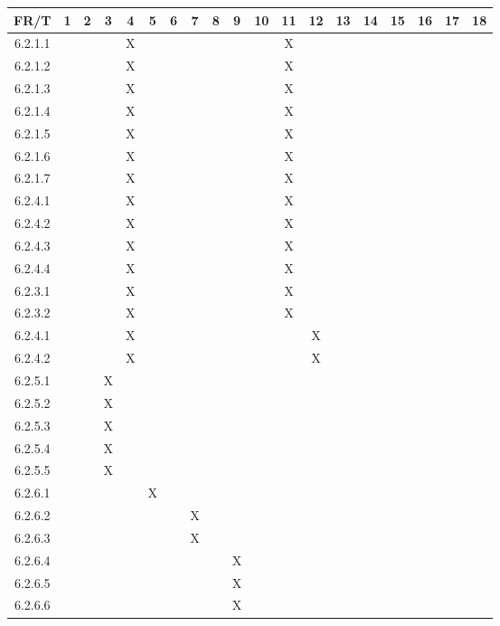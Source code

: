 \documentclass[12pt, titlepage]{article}
\begin{document}
\begin{tabular}{|c|c|c|c|c|c|c|c|c|c|c|c|c|c|c|c|c|c|c|}
    \hline
     FR/T &1 &2 &3 &4 &5 &6 &7 &8 &9 &10 &11 &12 &13 &14 &15 &16 &17 &18 \\
    \hline
     6.2.1.1 & & & &X & & & & & & &X & & & & & & & \\
     6.2.1.2 & & & &X & & & & & & &X & & & & & & & \\
     6.2.1.3 & & & &X & & & & & & &X & & & & & & & \\
     6.2.1.4 & & & &X & & & & & & &X & & & & & & & \\
     6.2.1.5 & & & &X & & & & & & &X & & & & & & & \\
     6.2.1.6 & & & &X & & & & & & &X & & & & & & & \\
     6.2.1.7 & & & &X & & & & & & &X & & & & & & & \\
     6.2.4.1 & & & &X & & & & & & &X & & & & & & & \\
     6.2.4.2 & & & &X & & & & & & &X & & & & & & & \\
     6.2.4.3 & & & &X & & & & & & &X & & & & & & & \\
     6.2.4.4 & & & &X & & & & & & &X & & & & & & & \\
     6.2.3.1 & & & &X & & & & & & &X & & & & & & & \\
     6.2.3.2 & & & &X & & & & & & &X & & & & & & & \\
     6.2.4.1 & & & &X & & & & & & & &X & & & & & & \\
     6.2.4.2 & & & &X & & & & & & & &X & & & & & & \\
     6.2.5.1 & & &X & & & & & & & & & & & & & & & \\
     6.2.5.2 & & &X & & & & & & & & & & & & & & & \\
     6.2.5.3 & & &X & & & & & & & & & & & & & & & \\
     6.2.5.4 & & &X & & & & & & & & & & & & & & & \\
     6.2.5.5 & & &X & & & & & & & & & & & & & & & \\
     6.2.6.1 & & & & &X & & & & & & & & & & & & & \\
     6.2.6.2 & & & & & & &X & & & & & & & & & & & \\
     6.2.6.3 & & & & & & &X & & & & & & & & & & & \\
     6.2.6.4 & & & & & & & & &X & & & & & & & & & \\
     6.2.6.5 & & & & & & & & &X & & & & & & & & & \\
     6.2.6.6 & & & & & & & & &X & & & & & & & & & \\

\end{tabular}
\end{document}
